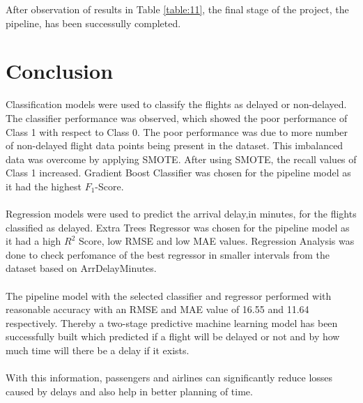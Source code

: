 \documentclass[12pt,letter-paper]{article}
\begin{document}
    After observation of results in Table \ref{table:11}, the final stage of the project, the pipeline, has been successully completed. 
    
\section{Conclusion}
    
    Classification models were used to classify the flights as delayed or non-delayed. The classifier performance was observed, which showed the poor performance of Class 1 with respect to Class 0. The poor performance was due to more number of non-delayed flight data points being present in the dataset. This imbalanced data was overcome by applying SMOTE. After using SMOTE, the recall values of Class 1 increased. Gradient Boost Classifier was chosen for the pipeline model as it had the highest $F_1$-Score.
    
    \paragraph{}
    Regression models were used to predict the arrival delay,in minutes, for the flights classified as delayed. Extra Trees Regressor was chosen for the pipeline model as it had a high $R^2$ Score, low RMSE and low MAE values. Regression Analysis was done to check perfomance of the best regressor in smaller intervals from the dataset based on ArrDelayMinutes.
    
    \paragraph{}
    The pipeline model with the selected classifier and regressor performed with reasonable accuracy with an RMSE and MAE value of 16.55 and 11.64 respectively. Thereby a two-stage predictive machine learning model has been successfully built which predicted if a flight will be delayed or not and by how much time will there be a delay if it exists. 
    
    \paragraph{}
    With this information, passengers and airlines can significantly reduce losses caused by delays and also help in better planning of time. 

    
\end{document}
